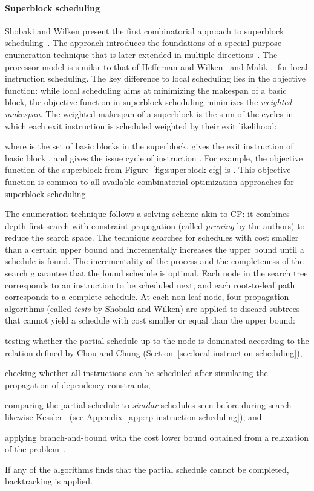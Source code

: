 \documentclass[acmsmall,authorversion,nonacm]{acmart}
\newcommand{\var}[2]{}
\begin{document}
\paragraph{Superblock scheduling}

Shobaki and Wilken present the first combinatorial approach to
superblock scheduling~\cite{Shobaki2004}.
The approach introduces the foundations of a special-purpose
enumeration technique that is later extended in multiple
directions~\cite{Shobaki2009,Shobaki2013}.
The processor model is similar to that of Heffernan and
Wilken~\cite{Heffernan2006} and Malik \etal{}~\cite{Malik2008} for
local instruction scheduling.
The key difference to local scheduling lies in the objective function:
while local scheduling aims at minimizing the makespan of a basic
block, the objective function in superblock scheduling minimizes the
\emph{weighted makespan}.
The weighted makespan of a superblock is the sum of the cycles in
which each exit instruction is scheduled weighted by their exit
likelihood:

where  is the set of basic blocks in the superblock,
 gives the exit instruction of basic block ,
and \var{s}{i} gives the issue cycle of instruction .
For example, the objective function of the superblock from
Figure~\ref{fig:superblock-cfg} is .
This objective function is common to all available combinatorial
optimization approaches for superblock scheduling.

The enumeration technique follows a solving scheme akin to CP: it
combines depth-first search with constraint propagation (called
\emph{pruning} by the authors) to reduce the search space.
The technique searches for schedules with cost smaller than a certain
upper bound and incrementally increases the upper bound until a
schedule is found.
The incrementality of the process and the completeness of the search
guarantee that the found schedule is optimal.
Each node in the search tree corresponds to an instruction to be
scheduled next, and each root-to-leaf path corresponds to a complete
schedule.
At each non-leaf node, four propagation algorithms (called
\emph{tests} by Shobaki and Wilken) are applied to discard subtrees
that cannot yield a schedule with cost smaller or equal than the upper
bound:
\begin{inparaitem}[]
\item testing whether the partial schedule up to the node is dominated
  according to the relation defined by Chou and Chung
  (Section~\ref{sec:local-instruction-scheduling}),
\item checking whether all instructions can be scheduled after
  simulating the propagation of dependency constraints,
\item comparing the partial schedule to \emph{similar} schedules seen
  before during search likewise Kessler~\cite{Kessler1998}
  (see Appendix~\ref{app:rp-instruction-scheduling}), and
\item applying branch-and-bound with the cost lower bound obtained
  from a relaxation of the problem~\cite{Rim1994,Langevin1996}.
\end{inparaitem}
If any of the algorithms finds that the partial schedule cannot be
completed, backtracking is applied.
\end{document}
